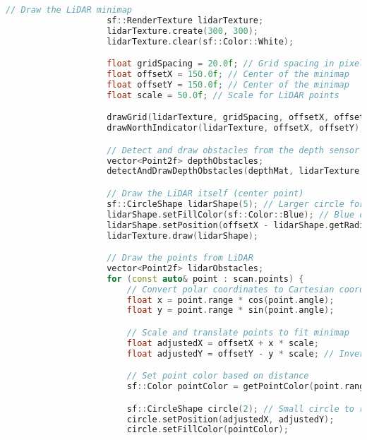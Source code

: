 \begin{lstlisting}[language={C++}, caption={C\'odigo de ejemplo de Kinect y LiDAR}, label={Script}]
                    // Draw the LiDAR minimap
                    sf::RenderTexture lidarTexture;
                    lidarTexture.create(300, 300);
                    lidarTexture.clear(sf::Color::White);

                    float gridSpacing = 20.0f; // Grid spacing in pixels
                    float offsetX = 150.0f; // Center of the minimap
                    float offsetY = 150.0f; // Center of the minimap
                    float scale = 50.0f; // Scale for LiDAR points

                    drawGrid(lidarTexture, gridSpacing, offsetX, offsetY);
                    drawNorthIndicator(lidarTexture, offsetX, offsetY);

                    // Detect and draw obstacles from the depth sensor
                    vector<Point2f> depthObstacles;
                    detectAndDrawDepthObstacles(depthMat, lidarTexture, offsetX, offsetY, scale, depthObstacles);

                    // Draw the LiDAR itself (center point)
                    sf::CircleShape lidarShape(5); // Larger circle for the center
                    lidarShape.setFillColor(sf::Color::Blue); // Blue color for the center
                    lidarShape.setPosition(offsetX - lidarShape.getRadius(), offsetY - lidarShape.getRadius());
                    lidarTexture.draw(lidarShape);

                    // Draw the points from LiDAR
                    vector<Point2f> lidarObstacles;
                    for (const auto& point : scan.points) {
                        // Convert polar coordinates to Cartesian coordinates
                        float x = point.range * cos(point.angle);
                        float y = point.range * sin(point.angle);

                        // Scale and translate points to fit minimap
                        float adjustedX = offsetX + x * scale;
                        float adjustedY = offsetY - y * scale; // Invert Y to match screen coordinates

                        // Set point color based on distance
                        sf::Color pointColor = getPointColor(point.range, 64.0f); // Assuming max range is 64 meters

                        sf::CircleShape circle(2); // Small circle to represent the point
                        circle.setPosition(adjustedX, adjustedY);
                        circle.setFillColor(pointColor);


\end{lstlisting}
